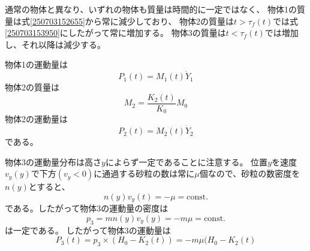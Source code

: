 \documentclass[]{article}
\begin{document}
通常の物体と異なり、いずれの物体も質量は時間的に一定ではなく、
物体1の質量は式\eqref{250703152655}から常に減少しており、
物体2の質量は$t>\tau_f(t)$では式\eqref{250703153950}にしたがって常に増加する。
物体3の質量は$t<\tau_f(t)$では増加し、それ以降は減少する。


物体1の運動量は
\begin{equation} \label{250917102959} 
   P_1(t)  = M_1(t) \dot{Y}_1 
\end{equation}
物体2の質量は
\begin{equation} \label{250917184641} 
   M_2 = \frac{K_2(t)}{K_0} M_0
\end{equation}
物体2の運動量は
\begin{equation} \label{250917103019} 
   P_2(t) = M_2(t)\dot{Y}_2  
\end{equation}
である。


物体3の運動量分布は高さ$y$によらず一定であることに注意する。
位置$y$を速度$v_y(y)$で下方$(v_y<0)$に通過する砂粒の数は常に$\mu$個なので、砂粒の数密度を$n(y)$とすると、
\begin{equation} \label{250917101402} 
   n(y) v_y(t) = -\mu = \text{const.}
\end{equation}
である。したがって物体3の運動量の密度は
\begin{equation} \label{250917102631} 
   p_3 = mn(y)v_y(y)= -m \mu = \text{const.}
\end{equation}
は一定である。
したがって物体3の運動量は
\begin{equation} \label{250917102719} 
   P_3(t) = p_3 \times (H_0 - K_2(t)) = -m\mu(H_0-K_2(t)
\end{equation}



%
%
%
\end{document}
